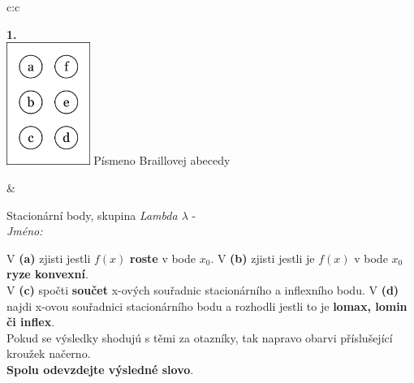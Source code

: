 \documentclass[10pt]{report}
\begin{document}
\begin{tabular}{c:c}
\begin{minipage}[c][104.5mm][t]{0.5\linewidth}
\begin{center}
\begin{minipage}{0.79\linewidth}
\end{minipage}
\begin{minipage}{0.20\linewidth}
\begin{center}
{\Huge\bfseries 1.} \\[2mm]
\includegraphics[height=40mm]{../images/braille.png}
{\small Písmeno Braillovej abecedy}
\end{center}
\end{minipage}
\end{center}
\end{minipage}
&
\begin{minipage}[c][104.5mm][t]{0.5\linewidth}
\begin{center}
\vspace{7mm}
{\huge Stacionární body, skupina \textit{Lambda $\lambda$} -}\\[5mm]
\textit{Jméno:}\phantom{xxxxxxxxxxxxxxxxxxxxxxxxxxxxxxxxxxxxxxxxxxxxxxxxxxxxxxxxxxxxxxxxx}\\[5mm]
\begin{minipage}{0.95\linewidth}
\begin{center}
{\small V \textbf{(a)} zjisti jestli $f(x)$ \textbf{roste} v bode $x_0$. V \textbf{(b)} zjisti jestli je $f(x)$ v bode $x_0$ \textbf{ryze konvexní}.\\V \textbf{(c)} spočti \textbf{součet} x-ových souřadnic stacionárního a inflexního bodu. V \textbf{(d)} najdi x-ovou souřadnici stacionárního bodu a rozhodli jestli to je \textbf{lomax, lomin či inflex}.\\Pokud se výsledky shodujú s těmi za otazníky, tak napravo obarvi příslušející kroužek načerno.\\\textbf{Spolu odevzdejte výsledné slovo}}.
\end{center}
\end{minipage}
\\[1mm]
\begin{minipage}{0.79\linewidth}
\begin{center}
\begin{varwidth}{\linewidth}
\begin{enumerate}
\normalsize

\end{enumerate}
\end{varwidth}
\end{center}
\end{minipage}
\end{center}
\end{minipage}
\end{tabular}
\end{document}
